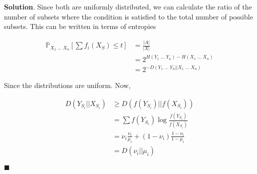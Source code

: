\documentclass[12pt]{article}
\theoremstyle{definition}
\newenvironment{s}{%
        \begin{trivlist} \item \textbf{Solution}. }{%
            \hspace*{\fill} $\blacksquare$\end{trivlist}}%
\begin{document}
{\begin{s}
Since both are uniformly distributed, we can calculate the ratio of the number of subsets where the condition is satisfied to the total number of possible subsets. This can be written in terms of entropies

\begin{align*}
\mathbb{P}_{X_{1}\; ... \; X_{n}} \left[\sum f_{i}(X_{S}) \leq t\right] &= \frac{|A|}{|X|} \\
&= 2^{H(Y_{1} \; ... \; Y_{n}) - H(X_{1} \; ... \; X_{n})}\\
&= 2^{-D(Y_{1} \; ... \; Y_{n}||X_{1} \; ... \; X_{n})}
\end{align*}

Since the distributions are uniform. Now, 

\begin{align*}
D(Y_{S_{i}}||X_{S_{i}}) &\geq D(f(Y_{S_{i}})||f(X_{S_{i}})) \\
&= \sum f(Y_{S_{i}})\log\frac{f(Y_{S_{i}})}{f(X_{S_{i}})}\\
&= \nu_{i}\frac{\nu_{i}}{\mu_{i}} + (1-\nu_{i})\frac{1-\nu_{i}}{1-\mu_{i}}\\
&= D(\nu_{i}||\mu_{i})
\end{align*}


\end{s}
\end{document}
